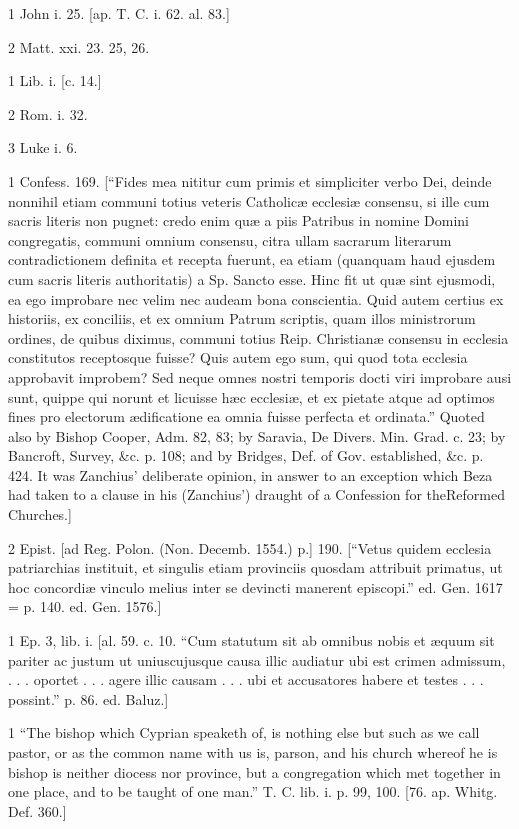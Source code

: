1
John i. 25. [ap. T. C. i. 62. al. 83.]

2
Matt. xxi. 23. 25, 26.

1
Lib. i. [c. 14.]

2
Rom. i. 32.

3
Luke i. 6.

1
Confess. 169. [“Fides mea nititur cum primis et simpliciter verbo Dei, deinde nonnihil etiam communi totius veteris Catholicæ ecclesiæ consensu, si ille cum sacris literis non pugnet: credo enim quæ a piis Patribus in nomine Domini congregatis, communi omnium consensu, citra ullam sacrarum literarum contradictionem definita et recepta fuerunt, ea etiam (quanquam haud ejusdem cum sacris literis authoritatis) a Sp. Sancto esse. Hinc fit ut quæ sint ejusmodi, ea ego improbare nec velim nec audeam bona conscientia. Quid autem certius ex historiis, ex conciliis, et ex omnium Patrum scriptis, quam illos ministrorum ordines, de quibus diximus, communi totius Reip. Christianæ consensu in ecclesia constitutos receptosque fuisse? Quis autem ego sum, qui quod tota ecclesia approbavit improbem? Sed neque omnes nostri temporis docti viri improbare ausi sunt, quippe qui norunt et licuisse hæc ecclesiæ, et ex pietate atque ad optimos fines pro electorum ædificatione ea omnia fuisse perfecta et ordinata.” Quoted also by Bishop Cooper, Adm. 82, 83; by Saravia, De Divers. Min. Grad. c. 23; by Bancroft, Survey, &c. p. 108; and by Bridges, Def. of Gov. established, &c. p. 424. It was Zanchius’ deliberate opinion, in answer to an exception which Beza had taken to a clause in his (Zanchius’) draught of a Confession for theReformed Churches.]

2
Epist. [ad Reg. Polon. (Non. Decemb. 1554.) p.] 190. [“Vetus quidem ecclesia patriarchias instituit, et singulis etiam provinciis quosdam attribuit primatus, ut hoc concordiæ vinculo melius inter se devincti manerent episcopi.” ed. Gen. 1617 = p. 140. ed. Gen. 1576.]

1
Ep. 3, lib. i. [al. 59. c. 10. “Cum statutum sit ab omnibus nobis et æquum sit pariter ac justum ut uniuscujusque causa illic audiatur ubi est crimen admissum, . . . oportet . . . agere illic causam . . . ubi et accusatores habere et testes . . . possint.” p. 86. ed. Baluz.]

1
“The bishop which Cyprian speaketh of, is nothing else but such as we call pastor, or as the common name with us is, parson, and his church whereof he is bishop is neither diocess nor province, but a congregation which met together in one place, and to be taught of one man.” T. C. lib. i. p. 99, 100. [76. ap. Whitg. Def. 360.]

